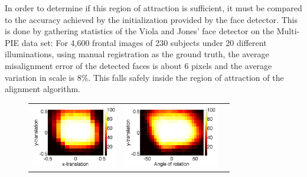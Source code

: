 In order to determine if this region of attraction is sufficient,
it must be compared to the accuracy achieved by the initialization
provided by the face detector.  This is done by gathering statistics 
of the Viola and Jones'
 face detector on the Multi-PIE data set: For 4,600 frontal
 images of 230 subjects under 20 different illuminations,
 using manual registration as the ground truth, the average
 misalignment error of the detected faces is about 6 pixels
 and the average variation in scale is 8\%. This falls
 safely inside the region of attraction of the alignment
 algorithm.
\newcommand{\tempheighta}[0]{1.1in}
\newcommand{\tempheightb}[0]{0.9in}
\begin{figure}
\centering
{
\begin{tabular}{ccc}
\includegraphics[height=\tempheighta]{figures_pami/x_y_roa.png} &
\includegraphics[height=\tempheighta]{figures_pami/y_theta_roa.png} &

\end{tabular}}
\end{figure}
